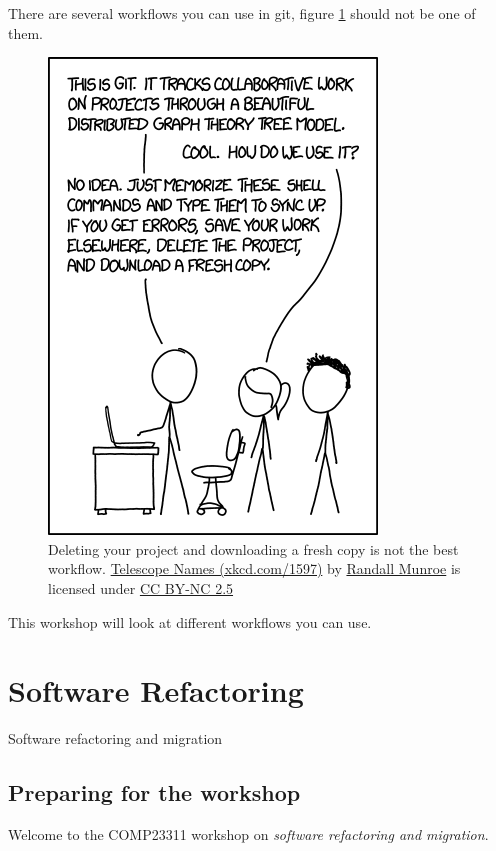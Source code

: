 \documentclass[
]{book}
\begin{document}
There are several workflows you can use in git, figure \ref{fig:xkcd-git-fig} should not be one of them.

\begin{figure}

{\centering \includegraphics[width=0.55\linewidth]{images/git} 

}

\caption{Deleting your project and downloading a fresh copy is not the best workflow. \href{https://xkcd.com/1597/}{Telescope Names (xkcd.com/1597)} by \href{https://en.wikipedia.org/wiki/Randall_Munroe}{Randall Munroe} is licensed under \href{https://creativecommons.org/licenses/by-nc/2.5/}{CC BY-NC 2.5}}\label{fig:xkcd-git-fig}
\end{figure}



This workshop will look at different workflows you can use.

\hypertarget{refactoring}{%
\chapter{Software Refactoring}\label{refactoring}}

Software refactoring and migration

\hypertarget{gitprep}{%
\section{Preparing for the workshop}\label{gitprep}}

Welcome to the COMP23311 workshop on \emph{software refactoring and migration}.
\end{document}

